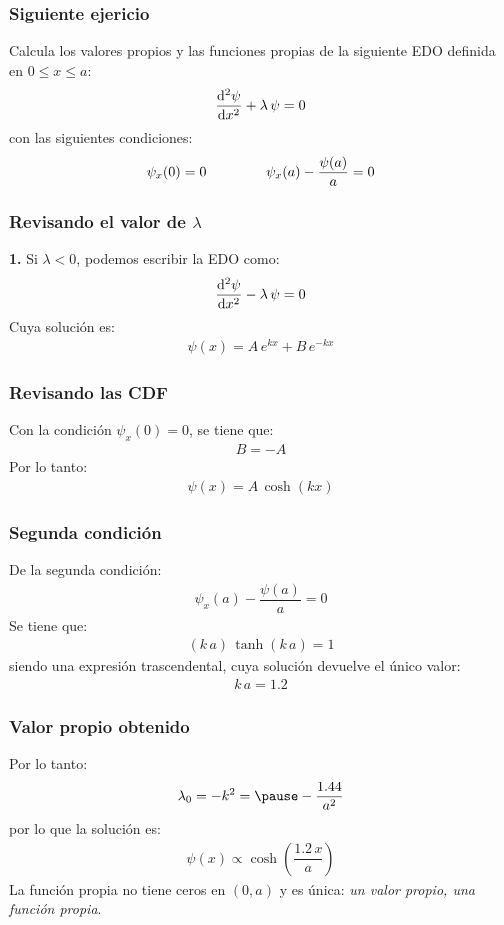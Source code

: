 \documentclass[12pt]{beamer}
\begin{document}
\begin{frame}
\frametitle{Siguiente ejericio}
Calcula los valores propios y las funciones propias de la siguiente EDO definida en $0 \leq x \leq a$:
\pause
\begin{align*}
\dv[2]{\psi}{x} + \lambda \, \psi = 0   
\end{align*}
con las siguientes condiciones:
\begin{align*}
\psi_{x}(0) = 0 \hspace{1.5cm} \psi_{x}(a) - \dfrac{\psi(a)}{a} = 0
\end{align*}
\end{frame}
\begin{frame}
\frametitle{Revisando el valor de $\lambda$}
\textbf{1.} Si $\lambda < 0$, podemos escribir la EDO como:
\pause
\begin{align*}
\dv[2]{\psi}{x} - \lambda \, \psi = 0   
\end{align*}
\pause
Cuya solución es:
\begin{align*}
\psi(x) = A \, e^{k x} + B \, e^{-k x}
\end{align*}
\end{frame}
\begin{frame}
\frametitle{Revisando las CDF}
Con la condición $\psi_{x}(0) = 0$, se tiene que:
\pause
\begin{align*}
B = - A
\end{align*}
\pause
Por lo tanto:
\pause
\begin{align*}
\psi(x) = A \, \cosh (k x)
\end{align*}
\end{frame}
\begin{frame}
\frametitle{Segunda condición}
De la segunda condición:
\begin{align*}
\psi_{x}(a) - \dfrac{\psi(a)}{a} = 0
\end{align*}
\pause
Se tiene que:
\pause
\begin{align*}
(k \, a) \, \tanh(k \, a) = 1
\end{align*}
siendo una expresión trascendental, cuya solución devuelve el único valor:
\begin{align*}
k \, a = 1.2
\end{align*}
\end{frame}
\begin{frame}
\frametitle{Valor propio obtenido}
Por lo tanto:
\begin{eqnarray*}
\lambda_{0} = - k^{2} = \pause - \dfrac{1.44}{a^{2}}
\end{eqnarray*}
\pause
por lo que la solución es:
\pause
\begin{align*}
\psi (x) \varpropto \cosh \left( \dfrac{1.2 \, x}{a} \right)
\end{align*}
\pause
La función propia no tiene ceros en $(0, a)$ y es única: \emph{un valor propio, una función propia}.
\end{frame}
\end{document}
